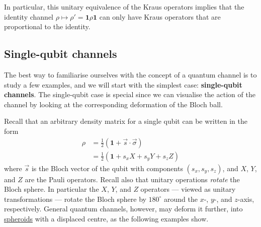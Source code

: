 \documentclass[fleqn,a4paper]{article}
\theoremstyle{definition}
\theoremstyle{definition}
\theoremstyle{definition}
\theoremstyle{definition}
\theoremstyle{remark}
\begin{document}
In particular, this unitary equivalence of the Kraus operators implies that the identity channel \(\rho\mapsto\rho'=\mathbf{1}\rho\mathbf{1}\) can only have Kraus operators that are proportional to the identity.

\hypertarget{single-qubit-channels}{%
\subsection{Single-qubit channels}\label{single-qubit-channels}}

The best way to familiarise ourselves with the concept of a quantum channel is to study a few examples, and we will start with the simplest case: \textbf{single-qubit channels}.
The single-qubit case is special since we can visualise the action of the channel by looking at the corresponding deformation of the Bloch ball.

Recall that an arbitrary density matrix for a single qubit can be written in the form
\[
  \begin{aligned}
    \rho
    &= \frac{1}{2}\left(\mathbf{1}+\vec{s}\cdot \vec\sigma\right)
  \\&= \frac{1}{2}\left(\mathbf{1}+s_x X+ s_y Y + s_z Z\right)
  \end{aligned}
\]
where \(\vec{s}\) is the Bloch vector of the qubit with components \((s_x, s_y, s_z)\), and \(X\), \(Y\), and \(Z\) are the Pauli operators.
Recall also that unitary operations \emph{rotate} the Bloch sphere.
In particular the \(X\), \(Y\), and \(Z\) operators --- viewed as unitary transformations --- rotate the Bloch sphere by \(180^\circ\) around the \(x\)-, \(y\)-, and \(z\)-axis, respectively.
General quantum channels, however, may deform it further, into \href{https://en.wikipedia.org/wiki/Spheroid}{spheroids} with a displaced centre, as the following examples show.
\end{document}
